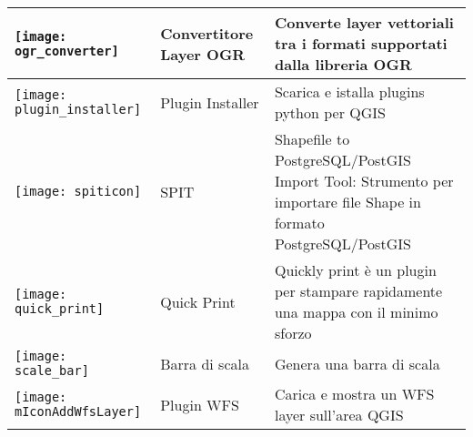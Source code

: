 \begin{minipage}{\textwidth}
\begin{table}[H]
\begin{tabular}{|l|l|p{4in}|}
\hline
\texttt{[image: ogr\_converter]}
 & Convertitore Layer OGR  \index{plugins!OGR converter} & Converte layer vettoriali tra i formati supportati dalla libreria OGR\\
\hline
\texttt{[image: plugin\_installer]}
 & Plugin Installer \index{plugins!Plugin Installer} & Scarica e istalla plugins python per QGIS \\
\hline
\texttt{[image: spiticon]}
 & SPIT \index{plugins!spit}& Shapefile to PostgreSQL/PostGIS Import Tool: Strumento per importare file Shape in formato PostgreSQL/PostGIS \\
\hline
\texttt{[image: quick\_print]}
 & Quick Print \index{plugins!quick print}& Quickly print è un plugin per stampare rapidamente una mappa con il minimo sforzo \\
\hline
\texttt{[image: scale\_bar]}
 & Barra di scala \index{plugins!scalebar}& Genera una barra di scala\\
\hline
\texttt{[image: mIconAddWfsLayer]}
 & Plugin WFS & Carica e mostra un WFS layer sull'area QGIS \\
\hline
\end{tabular}
\end{table}
\end{minipage}

\normalsize

\begin{Tip}\caption{\textsc{Settaggio dei Plugins salvati in un progetto}}
\end{Tip}
